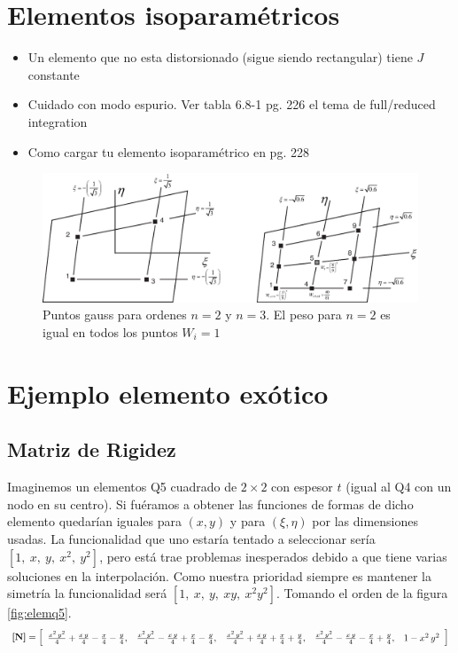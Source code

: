 \section{Elementos isoparamétricos}
\begin{itemize}
    \item Un elemento que no esta distorsionado (sigue siendo rectangular) tiene $J$ constante
    \item Cuidado con modo espurio. Ver tabla 6.8-1 pg. 226 el tema de full/reduced integration \cite{cook2007concepts}
    \item Como cargar tu elemento isoparamétrico en pg. 228
\end{itemize}

\begin{figure}[htb!]
    \centering
    \includegraphics[width=12cm]{fig/gauss_n3.eps}
    \caption{Puntos gauss para ordenes $n=2$ y $n=3$. El peso para $n=2$ es igual en todos los puntos $W_i=1$}
    \label{fig:gauss_n3}
\end{figure}

\section*{Ejemplo elemento exótico}
\subsection*{Matriz de Rigidez}
Imaginemos un elementos Q5 cuadrado de $2\times2$ con espesor $t$  (igual al Q4 con un nodo en su centro). Si fuéramos a obtener las funciones de formas de dicho elemento quedarían iguales para $(x,y)$ y para $(\xi,\eta)$ por las dimensiones usadas. La funcionalidad que uno estaría tentado a seleccionar sería $[1,\ x, \ y,\ x^2, \ y^2 ]$, pero está trae problemas inesperados debido a que tiene varias soluciones en la interpolación. Como nuestra prioridad siempre es mantener la simetría la funcionalidad será $[1,\ x,\ y,\ xy,\ x^2y^2 ]$.  Tomando el orden de la figura \ref{fig:elemq5}.
\[
\boldsymbol{[}\mathbf{N} \boldsymbol{]}=\left[\begin{array}{ccccc} \frac{x^2\,y^2}{4}+\frac{x\,y}{4}-\frac{x}{4}-\frac{y}{4}, & \frac{x^2\,y^2}{4}-\frac{x\,y}{4}+\frac{x}{4}-\frac{y}{4}, & \frac{x^2\,y^2}{4}+\frac{x\,y}{4}+\frac{x}{4}+\frac{y}{4}, & \frac{x^2\,y^2}{4}-\frac{x\,y}{4}-\frac{x}{4}+\frac{y}{4}, & 1-x^2\,y^2 \end{array}\right]
\]

